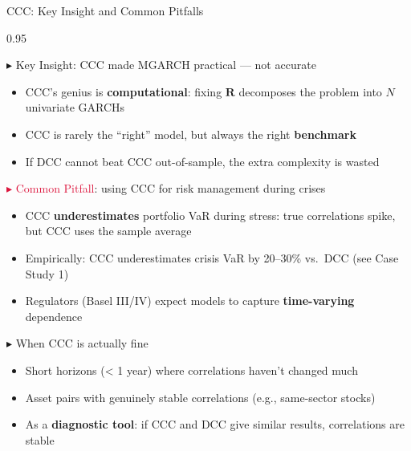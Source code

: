 \documentclass[9pt, aspectratio=169, t]{beamer}
\begin{document}
\begin{frame}{CCC: Key Insight and Common Pitfalls}
    \begin{cminipage}{0.95\textwidth}
    \vspace{-4mm}
    {\scriptsize
    \begin{block}{\textcolor{MainBlue}{$\blacktriangleright$ Key Insight}: CCC made MGARCH practical --- not accurate}
        \begin{itemize}\setlength{\itemsep}{0pt}
            \item CCC's genius is \textbf{computational}: fixing $\mathbf{R}$ decomposes the problem into $N$ univariate GARCHs
            \item CCC is rarely the ``right'' model, but always the right \textbf{benchmark}
            \item If DCC cannot beat CCC out-of-sample, the extra complexity is wasted
        \end{itemize}
    \end{block}
    \vspace{-2mm}
    \begin{alertblock}{\textcolor{Crimson}{$\blacktriangleright$ Common Pitfall}: using CCC for risk management during crises}
        \begin{itemize}\setlength{\itemsep}{0pt}
            \item CCC \textbf{underestimates} portfolio VaR during stress: true correlations spike, but CCC uses the sample average
            \item Empirically: CCC underestimates crisis VaR by 20--30\% vs.\ DCC (see Case Study 1)
            \item Regulators (Basel III/IV) expect models to capture \textbf{time-varying} dependence
        \end{itemize}
    \end{alertblock}
    \vspace{-2mm}
    \begin{exampleblock}{\textcolor{Forest}{$\blacktriangleright$ When CCC is actually fine}}
        \begin{itemize}\setlength{\itemsep}{0pt}
            \item Short horizons (< 1 year) where correlations haven't changed much
            \item Asset pairs with genuinely stable correlations (e.g., same-sector stocks)
            \item As a \textbf{diagnostic tool}: if CCC and DCC give similar results, correlations are stable
        \end{itemize}
    \end{exampleblock}
    }
    \end{cminipage}
\end{frame}
\end{document}
